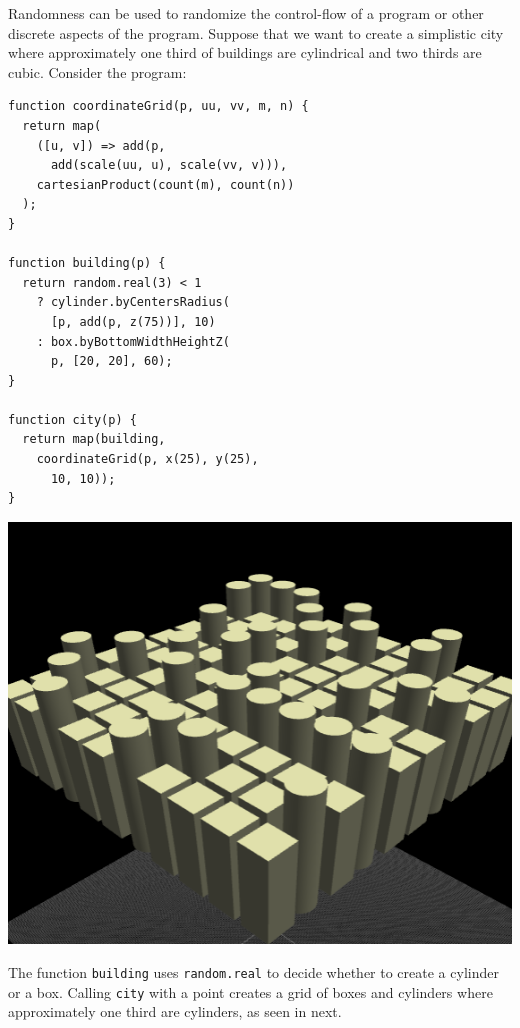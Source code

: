 Randomness can be used to randomize the control-flow of a program or other discrete aspects of the program.
Suppose that we want to create a simplistic city where approximately one third of buildings are cylindrical and two thirds are cubic.
Consider the program:

\noindent
\begin{minipage}{1.0\textwidth}
\begin{minipage}{0.5\textwidth}
\begin{verbatim}
function coordinateGrid(p, uu, vv, m, n) {
  return map(
    ([u, v]) => add(p,
      add(scale(uu, u), scale(vv, v))),
    cartesianProduct(count(m), count(n))
  );
}

function building(p) {
  return random.real(3) < 1
    ? cylinder.byCentersRadius(
      [p, add(p, z(75))], 10)
    : box.byBottomWidthHeightZ(
      p, [20, 20], 60);
}

function city(p) {
  return map(building,
    coordinateGrid(p, x(25), y(25),
      10, 10));
}
\end{verbatim}
\end{minipage}%
\begin{minipage}{0.5\textwidth}
  \includegraphics[width=1.0\textwidth]{./images/detail_examples/box_cyl_city_crop}
\end{minipage}
\end{minipage}

The function {\tt building} uses {\tt random.real} to decide whether to create a cylinder or a box.
Calling {\tt city} with a point creates a grid of boxes and cylinders where approximately one third are cylinders, as seen in next. %

